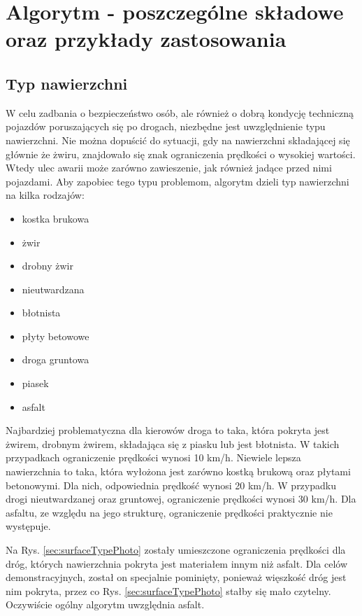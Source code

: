 \chapter{Algorytm - poszczególne składowe oraz przykłady zastosowania}
\label{cha:AlgorytmPraktyka}

\section{Typ nawierzchni}
\label{sec:surfaceType}

W celu zadbania o bezpieczeństwo osób, ale również o dobrą kondycję techniczną pojazdów poruszających się po drogach, niezbędne jest uwzględnienie typu nawierzchni. Nie można dopuścić do sytuacji, gdy na nawierzchni składającej się głównie że żwiru, znajdowało się znak ograniczenia prędkości o wysokiej wartości. Wtedy ulec awarii może zarówno zawieszenie, jak również jadące przed nimi pojazdami. Aby zapobiec tego typu problemom, algorytm dzieli typ nawierzchni na kilka rodzajów:

\begin{itemize}
\item kostka brukowa
\item żwir
\item drobny żwir
\item nieutwardzana
\item błotnista
\item płyty  betowowe
\item droga gruntowa
\item piasek
\item asfalt
\end{itemize}

Najbardziej problematyczna dla kierowów droga to taka, która pokryta jest żwirem, drobnym żwirem, składająca się z piasku lub jest błotnista. W takich przypadkach ograniczenie prędkości wynosi 10 km/h. Niewiele lepsza nawierzchnia to taka, która wyłożona jest zarówno kostką brukową oraz płytami betonowymi. Dla nich, odpowiednia prędkość wynosi 20 km/h. W przypadku drogi nieutwardzanej oraz gruntowej, ograniczenie prędkości wynosi 30 km/h. Dla asfaltu, ze względu na jego strukturę, ograniczenie prędkości praktycznie nie występuje.

Na Rys. \ref{sec:surfaceTypePhoto} zostały umieszczone ograniczenia prędkości dla dróg, których nawierzchnia pokryta jest materiałem innym niż asfalt. Dla celów demonstracyjnych, został on specjalnie pominięty, ponieważ więszkość dróg jest nim pokryta, przez co Rys. \ref{sec:surfaceTypePhoto} stałby się mało czytelny. Oczywiście ogólny algorytm uwzględnia asfalt.

